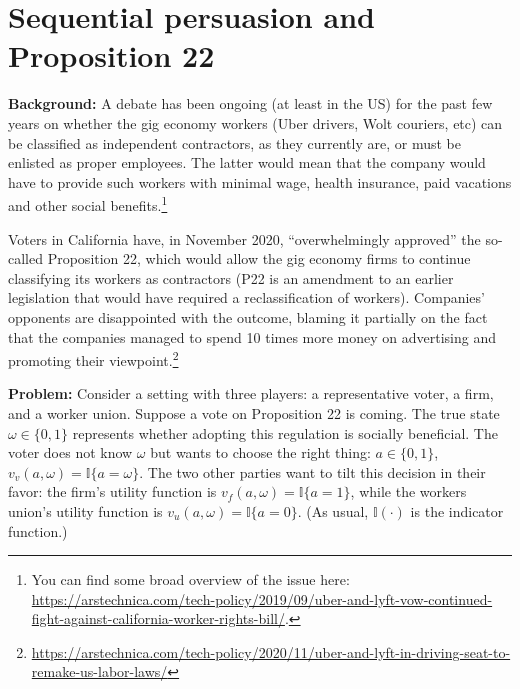 \documentclass[a4paper]{article}
\begin{document}
\fi



	
\section{Sequential persuasion and Proposition 22}

\textbf{Background:} 
A debate has been ongoing (at least in the US) for the past few years on whether the gig economy workers (Uber drivers, Wolt couriers, etc) can be classified as independent contractors, as they currently are, or must be enlisted as proper employees. The latter would mean that the company would have to provide such workers with minimal wage, health insurance, paid vacations and other social benefits.\footnote{You can find some broad overview of the issue here: \url{https://arstechnica.com/tech-policy/2019/09/uber-and-lyft-vow-continued-fight-against-california-worker-rights-bill/}.}

Voters in California have, in November 2020, ``overwhelmingly approved'' the so-called Proposition 22, which would allow the gig economy firms to continue classifying its workers as contractors (P22 is an amendment to an earlier legislation that would have required a reclassification of workers). Companies' opponents are disappointed with the outcome, blaming it partially on the fact that the companies managed to spend 10 times more money on advertising and promoting their viewpoint.\footnote{\url{https://arstechnica.com/tech-policy/2020/11/uber-and-lyft-in-driving-seat-to-remake-us-labor-laws/}} 

\textbf{Problem:}
Consider a setting with three players: a representative voter, a firm, and a worker union. Suppose a vote on Proposition 22 is coming. The true state $\omega \in \{0,1\}$ represents whether adopting this regulation is socially beneficial. The voter does not know $\omega$ but wants to choose the right thing: $a \in \{0,1\}$, $v_v(a,\omega) = \mathbb{I}\{a=\omega\}$. The two other parties want to tilt this decision in their favor: the firm's utility function is $v_f(a,\omega) = \mathbb{I}\{a=1\}$, while the workers union's utility function is $v_u(a,\omega) = \mathbb{I}\{a=0\}$. (As usual, $\mathbb{I}(\cdot)$ is the indicator function.)
\end{document}
